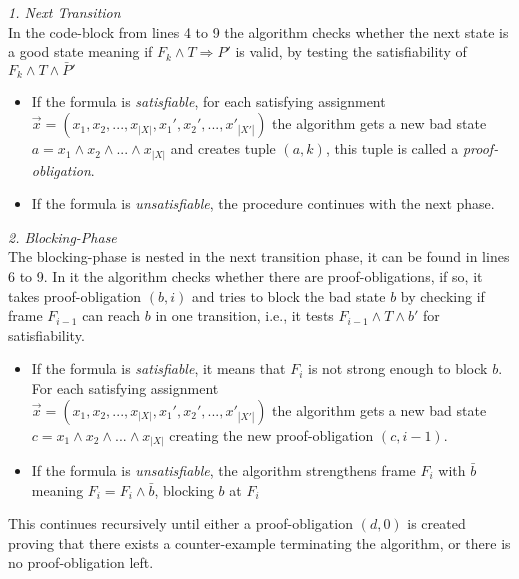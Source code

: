 \documentclass[11pt, a4paper, BCOR=10mm, ngerman]{scrbook}
\begin{document}
\textsl{1. Next Transition} \\ In the code-block from lines 4 to 9 the algorithm checks whether the next state is a good state meaning if $F_k \land T \Rightarrow P'$ is valid, by testing the satisfiability of $F_k \land T \land \bar P'$ 
\begin{itemize}
\item If the formula is \textsl{satisfiable}, for each satisfying assignment \\ $\vec{x} = (x_1, x_2, ..., x_{|X|}, x_1', x_2', ..., x'_{|X'|})$ the algorithm gets a new bad state \\ $a = x_1 \land x_2 \land ... \land x_{|X|}$ and creates tuple $(a, k)$, this tuple is called a \textsl{proof-obligation}.

\item If the formula is \textsl{unsatisfiable}, the procedure continues with the next phase. \\
\end{itemize}


\textsl{2. Blocking-Phase} \\ The blocking-phase is nested in the next transition phase, it can be found in lines 6 to 9. In it the algorithm checks whether there are proof-obligations, if so, 
it takes proof-obligation $(b, i)$ and tries to block the bad state $b$ by checking if frame $F_{i-1}$ can reach $b$ in one transition, i.e., it tests $F_{i-1} \land T \land b'$ for satisfiability.

\begin{itemize}
\item If the formula is \textsl{satisfiable}, it means that $F_{i}$ is not strong enough to block $b$. For each satisfying assignment \\ $\vec{x} = (x_1, x_2, ..., x_{|X|}, x_1', x_2', ..., x'_{|X'|})$ the algorithm gets a new bad state \\ $c = x_1 \land x_2 \land ... \land x_{|X|}$ creating the new proof-obligation $(c, i-1)$.

\item If the formula is \textsl{unsatisfiable}, the algorithm strengthens frame $F_{i}$ with $\bar b$ meaning $F_i = F_i \land \bar b$, blocking $b$ at $F_{i}$ 

\end{itemize}

This continues recursively until either a proof-obligation $(d, 0)$ is created proving that there exists a counter-example terminating the algorithm, or
there is no proof-obligation left. \\
\end{document}
